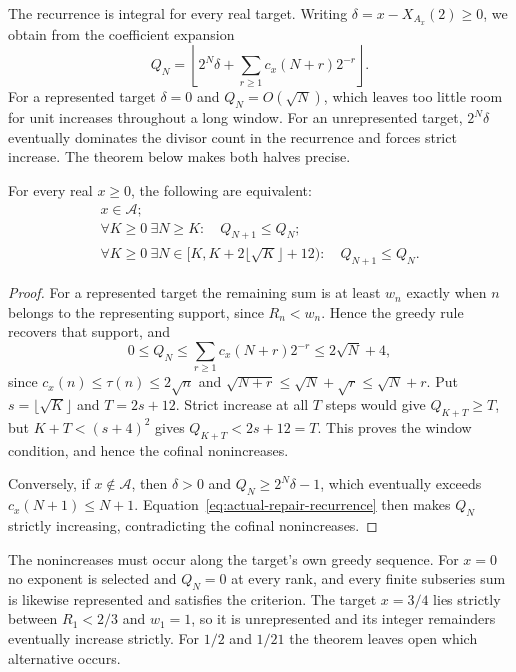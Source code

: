 \documentclass[11pt]{article}
\newcommand{\Ach}{\mathcal A}
\begin{document}
The recurrence is integral for every real target. Writing
$\delta=x-X_{A_x}(2)\ge0$, we obtain from the coefficient expansion
\[
 Q_N=\left\lfloor 2^N\delta+
             \sum_{r\ge1}c_x(N+r)2^{-r}\right\rfloor.
\]
For a represented target $\delta=0$ and $Q_N=O(\sqrt N)$, which leaves
too little room for unit increases throughout a long window. For an
unrepresented target, $2^N\delta$ eventually dominates the divisor
count in the recurrence and forces strict increase. The theorem below
makes both halves precise.


\begin{theorem}\label{res:general-repair}
For every real $x\ge0$, the following are equivalent:
\[
 \begin{gathered}
 x\in\Ach;\\
 \forall K\ge0\ \exists N\ge K:\quad Q_{N+1}\le Q_N;\\
 \forall K\ge0\ \exists N\in[K,K+2\lfloor\sqrt K\rfloor+12):
 \quad Q_{N+1}\le Q_N.
 \end{gathered}
\]
\end{theorem}

\begin{proof}
For a represented target the remaining sum is at least $w_n$ exactly
when $n$ belongs to the representing support, since $R_n<w_n$. Hence
the greedy rule recovers that support, and
\[
 0\le Q_N\le\sum_{r\ge1}c_x(N+r)2^{-r}
 \le2\sqrt N+4,
\]
since $c_x(n)\le\tau(n)\le2\sqrt n$ and
$\sqrt{N+r}\le\sqrt N+\sqrt r\le\sqrt N+r$.
Put $s=\lfloor\sqrt K\rfloor$ and $T=2s+12$. Strict increase at all
$T$ steps would give $Q_{K+T}\ge T$, but $K+T<(s+4)^2$ gives
$Q_{K+T}<2s+12=T$. This proves the window condition, and hence the
cofinal nonincreases.

Conversely, if $x\notin\Ach$, then $\delta>0$ and
$Q_N\ge2^N\delta-1$, which eventually exceeds $c_x(N+1)\le N+1$.
Equation~\eqref{eq:actual-repair-recurrence} then makes $Q_N$ strictly
increasing, contradicting the cofinal nonincreases.
\end{proof}

The nonincreases must occur along the target's own greedy sequence.
For $x=0$ no exponent is selected and $Q_N=0$ at every rank, and every
finite subseries sum is likewise represented and satisfies the
criterion. The target $x=3/4$ lies strictly between $R_1<2/3$ and
$w_1=1$, so it is unrepresented and its integer remainders eventually
increase strictly. For $1/2$ and $1/21$ the theorem leaves open which
alternative occurs.
\end{document}
